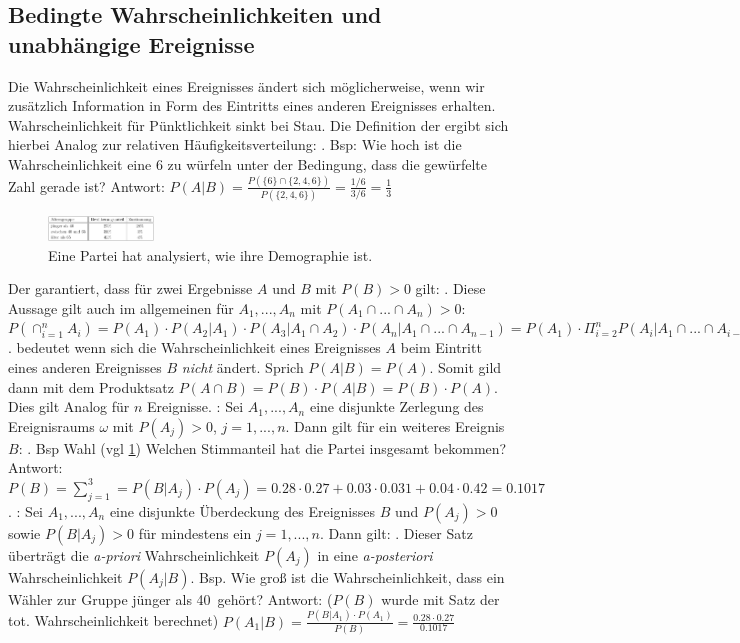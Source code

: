 \subsection{Bedingte Wahrscheinlichkeiten und unabhängige Ereignisse}
Die Wahrscheinlichkeit eines Ereignisses ändert sich möglicherweise, wenn wir zusätzlich Information in Form des Eintritts eines anderen Ereignisses erhalten. Wahrscheinlichkeit für Pünktlichkeit sinkt bei Stau. Die Definition der  ergibt sich hierbei Analog zur relativen Häufigkeitsverteilung: . Bsp: Wie hoch ist die Wahrscheinlichkeit eine 6 zu würfeln unter der Bedingung, dass die gewürfelte Zahl gerade ist? Antwort: $P(A|B) = \frac{P(\{6\} \cap \{2,4,6\})}{P(\{2,4,6\})} = \frac{1/6}{3/6} = \frac{1}{3}$\\
\begin{figure}
    \vspace{-6mm}
    \centering
    \includegraphics[width=0.25\textwidth]{images/beispiel_wahl_satz_der_tot_wahscheinlichkeit.png}
    \caption{Eine Partei hat analysiert, wie ihre Demographie ist.}
    \vspace{-5mm}
    \label{fig:pool_total}
\end{figure}
Der  garantiert, dass für zwei Ergebnisse $A$ und $B$ mit $P(B) > 0$ gilt: . Diese Aussage gilt auch im allgemeinen für $A_1, ..., A_n$ mit $P(A_1 \cap ... \cap A_n) > 0$:\\$P(\cap_{i=1}^nA_i) = P(A_1) \cdot P(A_2|A_1) \cdot P(A_3|A_1 \cap A_2) \cdot P(A_n|A_1 \cap ... \cap A_{n-1}) = P(A_1) \cdot \Pi_{i=2}^n P(A_i|A_1 \cap ... \cap A_{i-1})$.  bedeutet wenn sich die Wahrscheinlichkeit eines Ereignisses $A$ beim Eintritt eines anderen Ereignisses $B$ \emph{nicht} ändert. Sprich $P(A|B) = P(A)$. Somit gild dann mit dem Produktsatz $P(A \cap B) = P(B) \cdot P(A | B) = P(B) \cdot P(A)$. Dies gilt Analog für $n$ Ereignisse. : Sei $A_1, ..., A_n$ eine disjunkte Zerlegung des Ereignisraums $\omega$ mit $P(A_j) > 0$, $j = 1, ..., n$. Dann gilt für ein weiteres Ereignis $B$: . Bsp Wahl (vgl \cref{fig:pool_total}) Welchen Stimmanteil hat die Partei insgesamt bekommen? Antwort: $P(B) = \sum_{j=1}^3 = P(B|A_j) \cdot P(A_j) = 0.28 \cdot 0.27 + 0.03 \cdot 0.031 + 0.04 \cdot 0.42 = 0.1017$. : Sei $A_1, ..., A_n$ eine disjunkte Überdeckung des Ereignisses $B$ und $P(A_j) > 0$ sowie $P(B|A_j) > 0$ für mindestens ein $j = 1, ..., n$. Dann gilt: . Dieser Satz überträgt die \emph{a-priori} Wahrscheinlichkeit $P(A_j)$ in eine \emph{a-posteriori} Wahrscheinlichkeit $P(A_j|B)$. Bsp. Wie groß ist die Wahrscheinlichkeit, dass ein Wähler zur Gruppe \glqq jünger als 40\grqq\, gehört? Antwort: ($P(B)$ wurde mit Satz der tot. Wahrscheinlichkeit berechnet) $P(A_1|B) = \frac{P(B|A_1) \cdot P(A_1)}{P(B)} = \frac{0.28 \cdot 0.27}{0.1017}$
